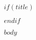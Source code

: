 \documentclass[20pt]{extarticle} %
\begin{document}
\tableofcontents
\newpage

$if(title)$
\maketitle
$endif$

$body$
\end{document}
